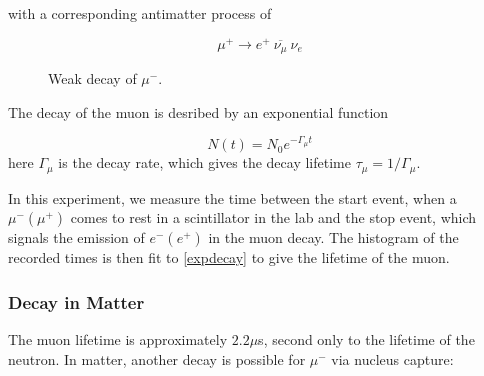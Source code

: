 with a corresponding antimatter process of

\begin{equation}\mu^+ \rightarrow e^+~\overline{\nu_{\mu}}~{\nu_e}\label{antimudecay}\end{equation}

\begin{figure}[h]
\begin{center}
\caption{Weak decay of $\mu^-$.}
\label{figure:mudecay}
\end{center}
\end{figure}

The decay of the muon is desribed by an exponential function

\begin{equation} N(t) = N_0 e^{-\Gamma_{\mu} t} \label{expdecay}\end{equation} 
here $\Gamma_{\mu}$ is the decay rate, which gives the decay lifetime
$\tau_{\mu} = 1/\Gamma_{\mu}$.

In this experiment, we measure the time between the start event, when
a $\mu^- (\mu^+)$ comes to rest in a scintillator in the lab and the
stop event, which signals the emission of $e^- (e^+)$ in the muon
decay. The histogram of the recorded times is then fit to
\eqref{expdecay} to give the lifetime of the muon.

\subsubsection{Decay in Matter}

The muon lifetime is approximately $2.2 \mu$s\cite{easwar}, second
only to the lifetime of the neutron. In matter, another decay is
possible for $\mu^-$ via nucleus capture:

